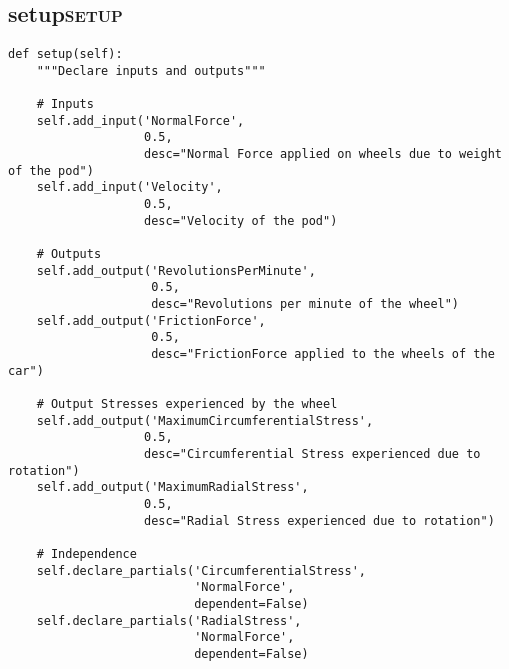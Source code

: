 \documentclass[11pt]{article}
\begin{document}
\subsection{setup\hfill{}\textsc{setup}}
\label{sec:org39774b4}
\begin{verbatim}
def setup(self):
    """Declare inputs and outputs"""

    # Inputs
    self.add_input('NormalForce',
                   0.5,
                   desc="Normal Force applied on wheels due to weight of the pod")
    self.add_input('Velocity',
                   0.5,
                   desc="Velocity of the pod")

    # Outputs
    self.add_output('RevolutionsPerMinute',
                    0.5,
                    desc="Revolutions per minute of the wheel")
    self.add_output('FrictionForce',
                    0.5,
                    desc="FrictionForce applied to the wheels of the car")

    # Output Stresses experienced by the wheel
    self.add_output('MaximumCircumferentialStress',
                   0.5,
                   desc="Circumferential Stress experienced due to rotation")
    self.add_output('MaximumRadialStress',
                   0.5,
                   desc="Radial Stress experienced due to rotation")

    # Independence
    self.declare_partials('CircumferentialStress',
                          'NormalForce',
                          dependent=False)
    self.declare_partials('RadialStress',
                          'NormalForce',
                          dependent=False)
\end{verbatim}
\end{document}
